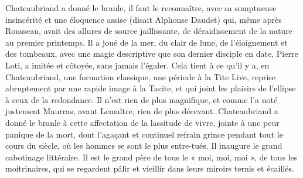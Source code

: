 \documentclass[french,twoside]{book} %
\begin{document}
Chateaubriand a donné le branle, il faut le reconnaître, avec sa somptueuse insincérité et une éloquence assise (disait Alphonse Daudet) qui, même après Rousseau, avait des allures de source jaillissante, de déraidissement de la nature au premier printemps. Il a joué de la mer, du clair de lune, de l’éloignement et des tombeaux, avec une magie descriptive que son dernier disciple en date, Pierre Loti, a imitée et côtoyée, sans jamais l’égaler. Cela tient à ce qu’il y a, en Chateaubriand, une formation classique, une période à la Tite Live, reprise abruptement par une rapide image à la Tacite, et qui joint les plaisirs de l’ellipse à ceux de la redondance. Il n’est rien de plus magnifique, et comme l’a noté justement Maurras, avant Lemaître, rien de plus décevant. Chateaubriand a donné le branle à cette affectation de la lassitude de vivre, jointe à une peur panique de la mort, dont l’agaçant et continuel refrain grince pendant tout le cours du siècle, où les hommes se sont le plus entre-tués. Il inaugure le grand cabotinage littéraire. Il est le grand père de tous le « moi, moi, moi », de tous les moitrinaires, qui se regardent pâlir et vieillir dans leurs miroirs ternis et écaillés.\par
\end{document}
